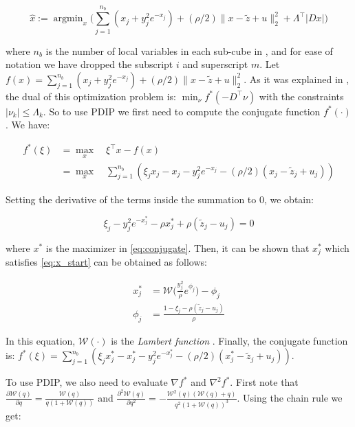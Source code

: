 \documentclass[letterpaper]{article} %
\DeclareMathOperator*{\argmin}{argmin}
\newcommand{\autoref}{\Cref}
\begin{document}
\begin{equation}
\hat{x}:=\argmin_{x} \bigg( \sum_{j=1}^{n_b} (x_j + y_j^2e^{-x_j}) + (\rho/2) \lVert x-\tilde{z} + u \lVert_2^2 + \Lambda^\top |D x| \bigg)
\label{eq:x_update_opt}
\end{equation}

\noindent where $n_b$ is the number of local variables in each sub-cube in \autoref{fig:data_cube}, and for ease of notation we have dropped the subscript $i$ and superscript $m$. Let $f(x)=\sum_{j=1}^{n_b} (x_j + y_j^2e^{-x_j}) + (\rho/2) \lVert x-\tilde{z} + u \lVert_2^2$. As it was explained in \autoref{sec:l1tf_var}, the dual of this optimization problem is: $\min_\nu f^*(-D^\top\nu)$ with the constraints $|\nu_k| \le \Lambda_k$. So to use PDIP we first need to compute the conjugate function $f^*(\cdot)$. We have:


\begin{align}
f^*(\xi) & = \max_x \quad \xi^\top x - f(x)\\
& =  \max_x \quad \sum_{j=1}^{n_b} (\xi_jx_j - x_j - y_j^2e^{-x_j} - (\rho/2)(x_j-\tilde{z}_j+u_j))
\label{eq:conjugate}
\end{align}

Setting the derivative of the terms inside the summation to 0, we obtain:

\begin{equation}
\xi_j-y_j^2e^{-x_j^*}-\rho x_j^* + \rho (\tilde{z}_j-u_j)=0
\label{eq:x_start}
\end{equation}

\noindent where $x^*$ is the maximizer in \ref{eq:conjugate}. Then, it can be shown that $x_j^*$ which satisfies \eqref{eq:x_start} can be obtained as follows:

\begin{align}
x^*_j & = \mathscr{W}\bigg(\frac{y_j^2}{\rho} e^{\phi_j} \bigg) - \phi_j \\
\phi_j & =\frac{1-\xi_j-\rho(\tilde{z}_j-u_j)}{\rho}
\end{align}

In this equation, $\mathscr{W}(\cdot)$ is the \textit{Lambert function} \cite{corless_lambertw_1996}. Finally, the conjugate function is: $f^*(\xi) = \sum_{j=1}^{n_b} (\xi_jx^*_j - x^*_j - y_j^2e^{-x^*_j} - (\rho/2)(x^*_j-\tilde{z}_j+u_j))$.

To use PDIP, we also need to evaluate $\nabla f^*$ and $\nabla^2 f^*$. First note that $\frac{\partial \mathscr{W}(q)}{\partial q} = \frac{\mathscr{W}(q)}{q(1+\mathscr{W}(q))}$ and $\frac{\partial^2 \mathscr{W}(q)}{\partial q^2} = - \frac{\mathscr{W}^2(q)(\mathscr{W}(q)+q)}{q^2(1+\mathscr{W}(q))^3}$. Using the chain rule we get:
\end{document}
